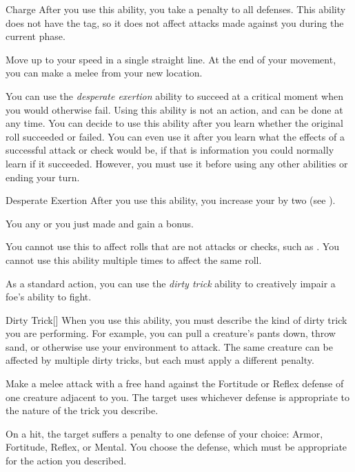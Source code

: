         \begin{activeability}{Charge}
            \rankline
            After you use this ability, you  take a  penalty to all defenses.
            This ability does not have the  tag, so it does not affect attacks made against you during the current phase.

            Move up to your speed in a single straight line.
            At the end of your movement, you can make a melee  from your new location.
        \end{activeability}

        \label{Desperate Exertion} You can use the \textit{desperate exertion} ability to succeed at a critical moment when you would otherwise fail.
        Using this ability is not an action, and can be done at any time.
        You can decide to use this ability after you learn whether the original roll succeeded or failed.
        You can even use it after you learn what the effects of a successful attack or check would be, if that is information you could normally learn if it succeeded.
        However, you must use it before using any other abilities or ending your turn.

        \begin{activeability}{Desperate Exertion}
            \rankline
            After you use this ability, you increase your  by two (see ).

            You  any  or  you just made and gain a  bonus.

            You cannot use this to affect rolls that are not attacks or checks, such as .
            You cannot use this ability multiple times to affect the same roll.
        \end{activeability}

        \label{Dirty Trick} As a standard action, you can use the \textit{dirty trick} ability to creatively impair a foe's ability to fight.

        \begin{activeability}{Dirty Trick}[]
            \rankline
            When you use this ability, you must describe the kind of dirty trick you are performing.
            For example, you can pull a creature's pants down, throw sand, or otherwise use your environment to attack.
            The same creature can be affected by multiple dirty tricks, but each must apply a different penalty.

            Make a melee attack with a free hand against the Fortitude or Reflex defense of one creature adjacent to you.
            The target uses whichever defense is appropriate to the nature of the trick you describe.

            On a hit, the target  suffers a  penalty to one defense of your choice: Armor, Fortitude, Reflex, or Mental.
            You choose the defense, which must be appropriate for the action you described.
        \end{activeability}

